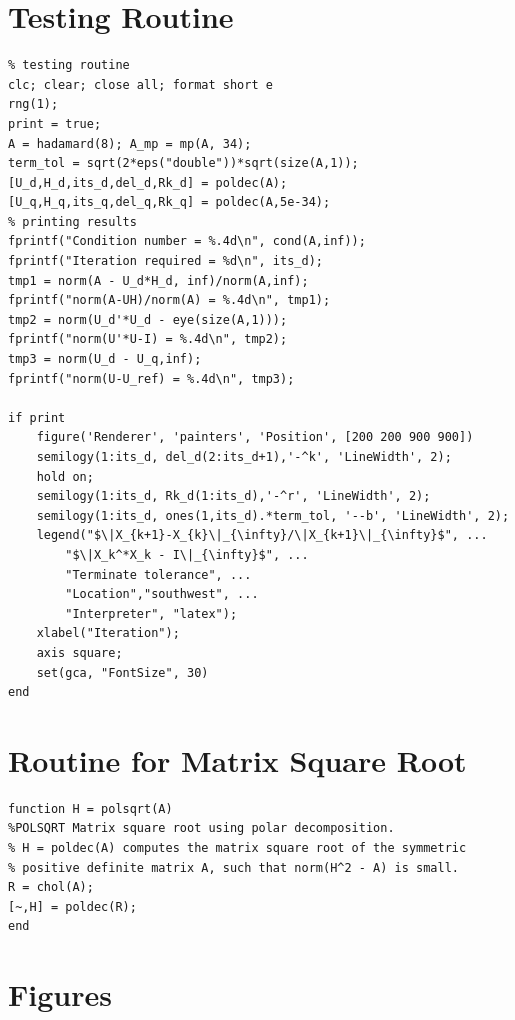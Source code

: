 \documentclass[12pt]{article}
\begin{document}
\section{Testing Routine} \label{app:testingroutine}
\begin{lstlisting}
% testing routine
clc; clear; close all; format short e
rng(1);
print = true;
A = hadamard(8); A_mp = mp(A, 34);
term_tol = sqrt(2*eps("double"))*sqrt(size(A,1));
[U_d,H_d,its_d,del_d,Rk_d] = poldec(A);
[U_q,H_q,its_q,del_q,Rk_q] = poldec(A,5e-34);
% printing results
fprintf("Condition number = %.4d\n", cond(A,inf));
fprintf("Iteration required = %d\n", its_d);
tmp1 = norm(A - U_d*H_d, inf)/norm(A,inf);
fprintf("norm(A-UH)/norm(A) = %.4d\n", tmp1);
tmp2 = norm(U_d'*U_d - eye(size(A,1)));
fprintf("norm(U'*U-I) = %.4d\n", tmp2);
tmp3 = norm(U_d - U_q,inf);
fprintf("norm(U-U_ref) = %.4d\n", tmp3);

if print 
    figure('Renderer', 'painters', 'Position', [200 200 900 900])
    semilogy(1:its_d, del_d(2:its_d+1),'-^k', 'LineWidth', 2);
    hold on;
    semilogy(1:its_d, Rk_d(1:its_d),'-^r', 'LineWidth', 2);
    semilogy(1:its_d, ones(1,its_d).*term_tol, '--b', 'LineWidth', 2);
    legend("$\|X_{k+1}-X_{k}\|_{\infty}/\|X_{k+1}\|_{\infty}$", ...
        "$\|X_k^*X_k - I\|_{\infty}$", ...
        "Terminate tolerance", ...
        "Location","southwest", ...
        "Interpreter", "latex");
    xlabel("Iteration");
    axis square;
    set(gca, "FontSize", 30)    
end
\end{lstlisting}

\section{Routine for Matrix Square Root}\label{app:matrix-squareroot}
\begin{lstlisting}
function H = polsqrt(A)
%POLSQRT Matrix square root using polar decomposition.
% H = poldec(A) computes the matrix square root of the symmetric 
% positive definite matrix A, such that norm(H^2 - A) is small.
R = chol(A);
[~,H] = poldec(R);
end
\end{lstlisting}

\section{Figures}\label{app:figs}
\end{document}
